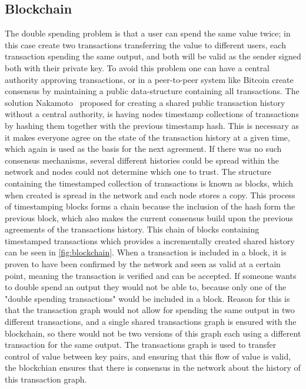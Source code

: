 \subsection{Blockchain}
\label{subsec:blockchain}

The double spending problem is that a user can spend the same value twice; in this case create two transactions transferring the value to different users, each transaction spending the same output, and both will be valid as the sender signed both with their private key. To avoid this problem one can have a central authority approving transactions, or in a peer-to-peer system like Bitcoin create consensus by maintaining a public data-structure containing all transactions. The solution Nakamoto~\cite{nakamoto2008bitcoin} proposed for creating a shared public transaction history without a central authority, is having nodes timestamp collections of transactions by hashing them together with the previous timestamp hash. This is necessary as it makes everyone agree on the state of the transaction history at a given time, which again is used as the basis for the next agreement. If there was no such consensus mechanisms, several different histories could be spread within the network and nodes could not determine which one to trust.
The structure containing the timestamped collection of transactions is known as blocks, which when created is spread in the network and each node stores a copy. 
This process of timestamping blocks forms a chain because the inclusion of the hash form the previous block, which also makes the current consensus build upon the previous agreements of the transactions history. This chain of blocks containing timestamped transactions which provides a incrementally created shared history can be seen in \cref{fig:blockchain}. When a transaction is included in a block, it is proven to have been confirmed by the network and seen as valid at a certain point, meaning the transaction is verified and can be accepted. If someone wants to double spend an output they would not be able to, because only one of the "double spending transactions" would be included in a block. Reason for this is that the transaction graph would not allow for spending the same output in two different transactions, and a single shared transactions graph is ensured with the blockchain, so there would not be two versions of this graph each using a different transaction for the same output. The transactions graph is used to transfer control of value between key pairs, and ensuring that this flow of value is valid, the blockchian ensures that there is consensus in the network about the history of this transaction graph.


